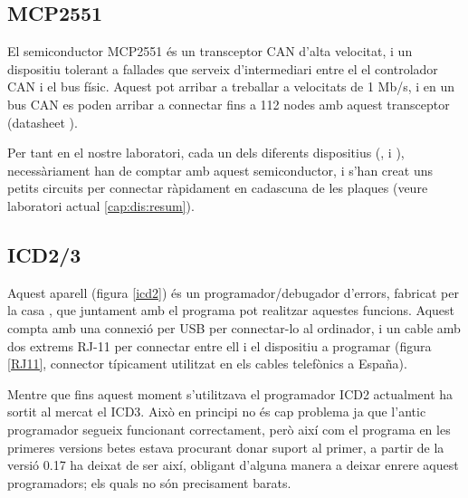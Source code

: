 \subsection{MCP2551}\label{cap:tec:hard:mcp2551}


El semiconductor MCP2551 és un transceptor CAN d'alta velocitat, i un dispositiu tolerant a fallades que serveix d'intermediari entre el el controlador CAN i el bus físic. Aquest pot arribar a treballar a velocitats de 1 Mb/s, i en un bus CAN es poden arribar a connectar fins a 112 nodes amb aquest transceptor (datasheet \cite{MCP2551}).

Per tant en el nostre laboratori, cada un dels diferents dispositius (\Monitor, \SensorActuador i \Controlador), necessàriament han de comptar amb aquest semiconductor, i s'han creat uns petits circuits per connectar ràpidament en cadascuna de les plaques \FLEX (veure laboratori actual \ref{cap:dis:resum}).

\subsection{ICD2/3}\label{cap:tec:hard:icd}


Aquest aparell (figura \ref{icd2}) és un programador/debugador d'errors, fabricat per la casa \Microchip, que juntament amb el programa \MplabX pot realitzar aquestes funcions. Aquest compta amb una connexió per USB per connectar-lo al ordinador, i un cable amb dos extrems RJ-11 per connectar entre ell i el dispositiu a programar (figura \ref{RJ11}, connector típicament utilitzat en els cables telefònics a España).

Mentre que fins aquest moment s'utilitzava el programador ICD2 actualment ha sortit al mercat el ICD3. Això en principi no és cap problema ja que l'antic programador segueix funcionant correctament, però així com el programa \MplabX en les primeres versions betes estava procurant donar suport al primer, a partir de la versió 0.17 ha deixat de ser així, obligant d'alguna manera a deixar enrere aquest programadors; els quals no són precisament barats.

